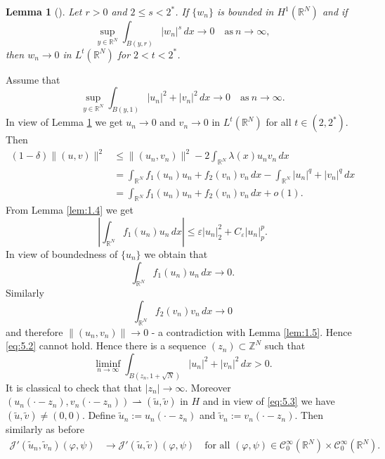 \documentclass{scrartcl}
\newtheorem{Lem}[Th]{Lemma}
\newcommand{\cC}{{\mathcal C}}
\newcommand{\cJ}{{\mathcal J}}
\newcommand{\cN}{{\mathcal N}}
\newcommand{\R}{\mathbb{R}}
\newcommand{\weakto}{\rightharpoonup}
\numberwithin{equation}{section}
\begin{document}
\begin{Lem}[{\cite[Lemma 1.21]{Willem}}]\label{lem:lions}
Let $r > 0$ and $2 \leq s < 2^*$. If $\{ w_n \}$ is bounded in $H^1 (\R^N)$ and if
\begin{equation}\label{lions}
\sup_{y \in \R^N} \int_{B(y,r)} |w_n|^s \, dx \to 0 \quad \mbox{as} \ n\to\infty,
\end{equation}
then $w_n \to 0$ in $L^t (\R^N)$ for $2 < t < 2^*$.
\end{Lem} 

Assume that
\begin{equation}\label{eq:5.2}
\sup_{y \in \R^N} \int_{B(y,1)} |u_n|^2 + |v_n|^2 \, dx \to 0 \quad \mbox{as} \ n \to \infty. 
\end{equation}
In view of Lemma \ref{lem:lions} we get $u_n \to 0$ and $v_n \to 0$ in $L^{t} (\R^N)$ for all $t \in (2,2^*)$. Then
\begin{align*}
(1-\delta) \| (u,v)\|^2 &\leq \| (u_n, v_n) \|^2 - 2 \int_{\R^N} \lambda(x) u_n v_n \, dx \\ &=  \int_{\R^N} f_1 (u_n)u_n + f_2 (v_n)v_n \, dx - \int_{\R^N} |u_n|^q + |v_n|^q \, dx \\
&= \int_{\R^N} f_1 (u_n)u_n + f_2 (v_n)v_n \, dx + o(1).
\end{align*}
From Lemma \ref{lem:1.4} we get
$$
\left| \int_{\R^N} f_1 (u_n) u_n \, dx \right| \leq \varepsilon |u_n|_2^2 + C_\varepsilon |u_n|_p^p.
$$
In view of boundedness of $\{ u_n \}$ we obtain that 
$$
\int_{\R^N} f_1 (u_n) u_n \, dx \to 0.
$$
Similarly 
$$
\int_{\R^N} f_2 (v_n) v_n \, dx \to 0
$$
and therefore $\|(u_n, v_n)\| \to 0$ - a contradiction with Lemma \ref{lem:1.5}. Hence \eqref{eq:5.2} cannot hold. Hence there is a sequence $(z_n) \subset \mathbb{Z}^N$ such that
\begin{equation}\label{eq:5.3}
\liminf_{n\to\infty} \int_{B(z_n, 1+\sqrt{N})} |u_n|^2 + |v_n|^2 \, dx > 0.
\end{equation}
It is classical to check that that $|z_n| \to \infty$. Moreover $(u_n (\cdot - z_n), v_n (\cdot - z_n) ) \weakto (\tilde{u}, \tilde{v})$ in $H$ and in view of \eqref{eq:5.3} we have $(\tilde{u}, \tilde{v}) \neq (0,0)$. Define $\tilde{u}_n := u_n (\cdot - z_n)$ and $\tilde{v}_n := v_n (\cdot - z_n)$. Then similarly as before
\begin{align*}
\cJ'(\tilde{u}_n, \tilde{v}_n) (\varphi, \psi) &\to \cJ'(\tilde{u}, \tilde{v}) (\varphi, \psi) \quad \mbox{for all } (\varphi, \psi) \in \cC_0^\infty (\R^N) \times \cC_0^\infty (\R^N).%
\end{align*}
\end{document}

